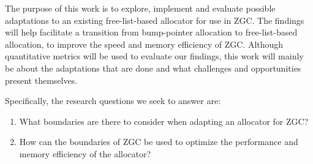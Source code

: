 
The purpose of this work is to explore, implement and evaluate possible adaptations to an existing free-list-based allocator for use in ZGC. The findings will help facilitate a transition from bump-pointer allocation to free-list-based allocation, to improve the speed and memory efficiency of ZGC. Although quantitative metrics will be used to evaluate our findings, this work will mainly be about the adaptations that are done and what challenges and opportunities present themselves.

Specifically, the research questions we seek to answer are:

\begin{enumerate}
    \item What boundaries are there to consider when adapting an allocator for ZGC?
    \item How can the boundaries of ZGC be used to optimize the performance and memory efficiency of the allocator?
\end{enumerate}

